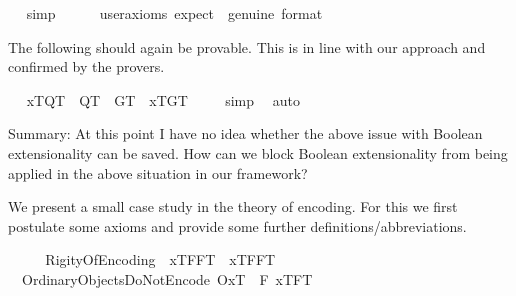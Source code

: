 \begin{isabellebody}
\isadelimproof
\ %
\endisadelimproof
%
\isatagproof
{}\isamarkupfalse%
\ simp\ \isanewline
\ \ \ \isamarkupfalse%
\ {\isacharbrackleft}user{\isacharunderscore}axioms{\isacharcomma}\ expect\ {\isacharequal}\ genuine{\isacharcomma}\ format\ {\isacharequal}\ {}{\isacharbrackright}\ \isamarkupfalse%
%
\endisatagproof
{\isafoldproof}%
%
\isadelimproof
%
\endisadelimproof
%
\begin{isamarkuptext}%
The following should again be provable. This is in line with our approach and confirmed
  by the provers.%
\end{isamarkuptext}\isamarkuptrue%
\ \isamarkupfalse%
\ {\isachardoublequoteopen}{\isacharbrackleft}{\isacharparenleft}{\isasymlbrace}x\isactrlsup T{\isacharcomma}Q\isactrlsup T{\isasymrbrace}\ \isactrlbold {\isasymand}\ Q\isactrlsup T\ \isactrlbold {\isacharequal}\ G\isactrlsup T{\isacharparenright}\ \isactrlbold {\isasymrightarrow}\ {\isasymlbrace}x\isactrlsup T{\isacharcomma}G\isactrlsup T{\isasymrbrace}{\isacharbrackright}\ {\isacharequal}\ {\isasymtop}{\isachardoublequoteclose}%
\isadelimproof
\ %
\endisadelimproof
%
\isatagproof
{}\isamarkupfalse%
\ simp\ \isamarkupfalse%
\ auto%
\endisatagproof
{\isafoldproof}%
%
\isadelimproof
%
\endisadelimproof
%
\begin{isamarkuptext}%
Summary: At this point I have no idea whether the above issue with Boolean extensionality
  can be saved. How can we block Boolean extensionality from being applied in the above 
  situation in our framework?%
\end{isamarkuptext}\isamarkuptrue%
%
\isamarkuptrue%
%
\begin{isamarkuptext}%
We present a small case study in the theory of encoding. For this we first
 postulate some axioms and provide some further definitions/abbreviations.%
\end{isamarkuptext}\isamarkuptrue%
\ \isamarkupfalse%
\ \isanewline
\ \ RigityOfEncoding{\isacharcolon}\ \ {\isachardoublequoteopen}{\isacharbrackleft}{\isasymlbrace}x\isactrlsup T{\isacharcomma}FF\isactrlsup T{\isasymrbrace}\ \isactrlbold {\isasymrightarrow}\ \isactrlbold {\isasymbox}{\isasymlbrace}x\isactrlsup T{\isacharcomma}FF\isactrlsup T{\isasymrbrace}{\isacharbrackright}\ {\isacharequal}\ {\isasymtop}{\isachardoublequoteclose}\ \isanewline
\ \ OrdinaryObjectsDoNotEncode{\isacharcolon}\ {\isachardoublequoteopen}{\isacharbrackleft}{\isasymlparr}O{\isacharbang}{\isacharcomma}x\isactrlsup T{\isasymrparr}\ \isactrlbold {\isasymrightarrow}\ \isactrlbold {\isasymbox}{\isacharparenleft}\isactrlbold {\isasymnot}{\isacharparenleft}\isactrlbold {\isasymexists}F{\isachardot}\ {\isasymlbrace}x\isactrlsup T{\isacharcomma}F\isactrlsup T{\isasymrbrace}{\isacharparenright}{\isacharparenright}{\isacharbrackright}\ {\isacharequal}\ {\isasymtop}{\isachardoublequoteclose}\ \isanewline

\end{isabellebody}
